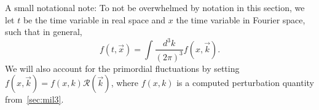 







A small notational note: To not be overwhelmed by notation in this section, we let $t$ be the time variable in real space and $x$ the time variable in Fourier space, such that in general,
\begin{equation}
    f(t, \vec{x}) = \int \frac{d^3 k}{(2\pi)^3} f(x, \vec{k}).
\end{equation}
We will also account for the primordial fluctuations by setting $f(x,\vec{k})= f(x, k) \mathcal{R}(\vec{k})$, where $f(x,k)$ is a computed perturbation quantity from~\cref{sec:mil3}.










